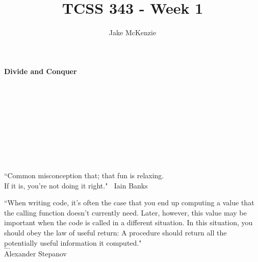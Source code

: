 \documentclass[12pt]{article}
\begin{document}
\title{TCSS 343 - Week 1}
\author{Jake McKenzie}
\maketitle
\noindent\centerline{\textbf{Divide and Conquer}}\\\\\\\\\\\\\\\\
\begin{center}
    ``Common misconception that; that fun is relaxing. \\If it is, you’re not doing it right." $~$ Iain Banks
\end{center}
\begin{center}
    ``When writing code, it’s often the case that you end up computing a value that the calling function doesn’t currently need. Later, however, this value may be important when the code is called in a different situation. In this situation, you should obey the law of useful return: A procedure should return all the potentially useful information it computed." \\
    $\dots$\\
    Alexander Stepanov
\end{center}
\newpage
\end{document}
